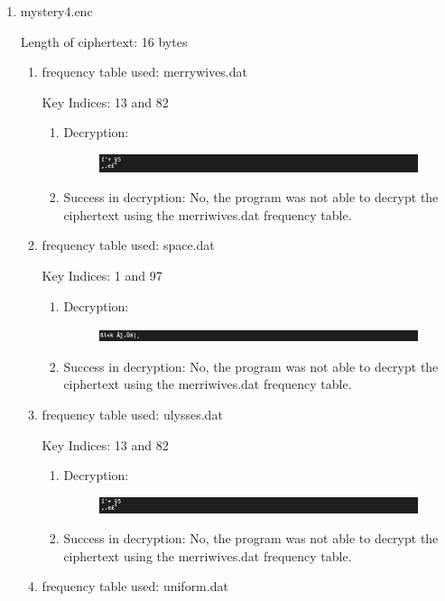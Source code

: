 \documentclass{ashoka-crypto}
\begin{document}
\begin{enumerate}
\item mystery4.enc

Length of ciphertext: 16 bytes

\begin{enumerate}
\item frequency table used: merrywives.dat

Key Indices: 13 and 82
\begin{enumerate}
\item Decryption:

\begin{figure}[h]
\includegraphics[width=12cm]{3_4_merrywives}
\centering
\end{figure}

\item Success in decryption: No, the program was not able to decrypt the ciphertext using the merriwives.dat frequency table.
\end{enumerate}
\item frequency table used: space.dat

Key Indices: 1 and 97
\begin{enumerate}
\item Decryption:

\begin{figure}[h]
\includegraphics[width=12cm]{3_4_space}
\centering
\end{figure}

\item Success in decryption: No, the program was not able to decrypt the ciphertext using the merriwives.dat frequency table.
\end{enumerate}
\item frequency table used: ulysses.dat

Key Indices: 13 and 82
\begin{enumerate}
\item Decryption:

\begin{figure}[h]
\includegraphics[width=12cm]{3_4_ulysses}
\centering
\end{figure}

\item Success in decryption: No, the program was not able to decrypt the ciphertext using the merriwives.dat frequency table.
\end{enumerate}
\clearpage 
\item frequency table used: uniform.dat


\end{enumerate}
\end{enumerate}
\end{document}
